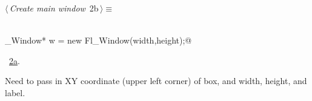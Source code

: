 \documentclass{article}
\renewcommand{\NWtarget}[2]{\hypertarget{#1}{#2}}
\renewcommand{\NWlink}[2]{\hyperlink{#1}{#2}}
\begin{document}
\begin{flushleft} \small
\begin{minipage}{\linewidth}\label{scrap2}\raggedright\small
\NWtarget{nuweb2b}{} $\langle\,${\it Create main window}\nobreak\ {\footnotesize {2b}}$\,\rangle\equiv$
\vspace{-1ex}
\begin{list}{}{} \item
\mbox{}\verb@@\\
\mbox{}\verb@Fl_Window* w = new Fl_Window(width,height);@\\
\mbox{}\verb@@{\NWsep}
\end{list}
\vspace{-1.5ex}
\footnotesize
\begin{list}{}{\setlength{\itemsep}{-\parsep}\setlength{\itemindent}{-\leftmargin}}
\item \NWtxtMacroRefIn\ \NWlink{nuweb2a}{2a}.

\item{}
\end{list}
\end{minipage}\vspace{4ex}
\end{flushleft}
Need to pass in XY coordinate (upper left corner) of box, and width, height, and label.
\end{document}
